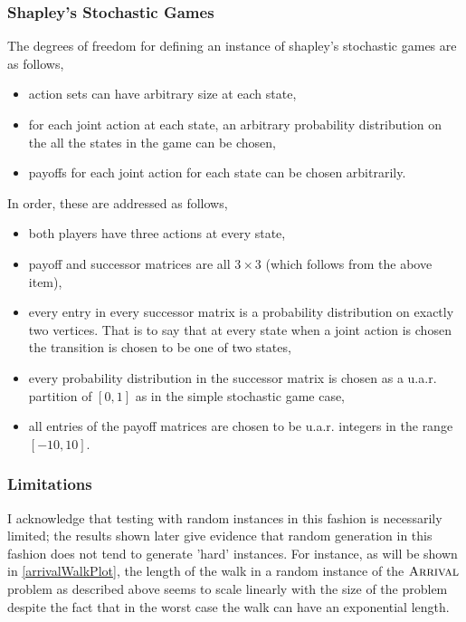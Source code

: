 \subsubsection{Shapley's Stochastic Games} \label{shapleyRandom}
The degrees of freedom for defining an instance of shapley's stochastic games are as follows,
\begin{itemize}
  \item action sets can have arbitrary size at each state,
  \item for each joint action at each state, an arbitrary probability distribution on the all
    the states in the game can be chosen,
  \item payoffs for each joint action for each state can be chosen arbitrarily.
\end{itemize}
In order, these are addressed as follows,
\begin{itemize}
  \item both players have three actions at every state,
  \item payoff and successor matrices are all $3 \times 3$ (which follows from the above item),
  \item every entry in every successor matrix is a probability distribution on exactly two vertices.
    That is to say that at every state when a joint action is chosen the transition is chosen
    to be one of two states,
  \item every probability distribution in the successor matrix is chosen as a u.a.r. partition of $[0, 1]$
    as in the simple stochastic game case,
  \item all entries of the payoff matrices are chosen to be u.a.r. integers in the range $[-10, 10]$.
\end{itemize}
\subsubsection{Limitations}
I acknowledge that testing with random instances in this fashion is necessarily limited; the results
shown later give evidence that random generation in this fashion does not tend to generate 'hard' instances.
For instance, as will be shown in \cref{arrivalWalkPlot}, the length of the walk in a random instance
of the $\textsc{Arrival}$ problem as described above seems to scale linearly with the size of the problem despite
the fact that in the worst case the walk can have an exponential length.
